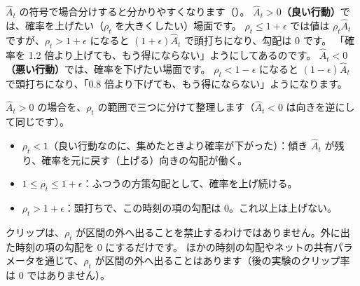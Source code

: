 $\hat{A}_t$ の符号で場合分けすると分かりやすくなります（）。
\textbf{$\hat{A}_t>0$（良い行動）}では、確率を上げたい（$\rho_t$ を大きくしたい）場面です。
$\rho_t\le1+\epsilon$ では値は $\rho_t\hat{A}_t$ ですが、$\rho_t>1+\epsilon$ になると $(1+\epsilon)\hat{A}_t$ で頭打ちになり、勾配は 0 です。
「確率を 1.2 倍より上げても、もう得にならない」ようにしてあるのです。
\textbf{$\hat{A}_t<0$（悪い行動）}では、確率を下げたい場面です。
$\rho_t<1-\epsilon$ になると $(1-\epsilon)\hat{A}_t$ で頭打ちになり、「0.8 倍より下げても、もう得にならない」ようになります。

$\hat{A}_t>0$ の場合を、$\rho_t$ の範囲で三つに分けて整理します（$\hat{A}_t<0$ は向きを逆にして同じです）。
\begin{itemize}
\item $\rho_t<1$（良い行動なのに、集めたときより確率が下がった）：傾き $\hat{A}_t$ が残り、確率を元に戻す（上げる）向きの勾配が働く。
\item $1\le\rho_t\le1+\epsilon$：ふつうの方策勾配として、確率を上げ続ける。
\item $\rho_t>1+\epsilon$：頭打ちで、この時刻の項の勾配は 0。これ以上は上げない。
\end{itemize}
クリップは、$\rho_t$ が区間の外へ出ることを禁止するわけではありません。外に出た時刻の項の勾配を 0 にするだけです。
ほかの時刻の勾配やネットの共有パラメータを通じて、$\rho_t$ が区間の外へ出ることはあります（後の実験のクリップ率は 0 ではありません）。


